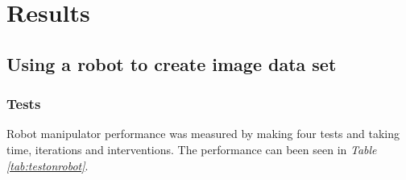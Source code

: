 \chapter{Results}

\section{Using a robot to create image data set}\label{resrobotcontrol}

\subsection*{Tests}
Robot manipulator performance was measured by making four tests and taking time, iterations and interventions. The performance can been seen in \textit{Table \ref{tab:testonrobot}}.

